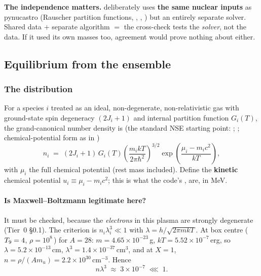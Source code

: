\textbf{The independence matters.}  deliberately uses \textbf{the
same nuclear inputs} as pynucastro (Rauscher partition functions,
, , ) but
an entirely separate solver. Shared data $+$ separate algorithm $=$ the
cross-check tests the \emph{solver}, not the data. If it used its own masses
too, agreement would prove nothing about either.

\subsection{Equilibrium from the ensemble}
\label{sec:ensemble}

\subsubsection{The distribution}
\label{sec:distribution}

For a species $i$ treated as an ideal, non-degenerate, non-relativistic gas with
ground-state spin degeneracy $(2J_i + 1)$ and internal partition function
$G_i(T)$, the grand-canonical number density is (the standard NSE starting
point: \citealp{clifford1965}; \citealp{hwe1985}; chemical-potential form as in
\citealp{seitenzahl2009})
%
\begin{equation}
n_i \;=\; (2J_i+1)\,G_i(T)\left(\frac{m_i kT}{2\pi\hbar^2}\right)^{3/2}
\exp\!\left(\frac{\mu_i - m_i c^2}{kT}\right),
\label{eq:ndensity}
\end{equation}
%
with $\mu_i$ the full chemical potential (rest mass included). Define the
\textbf{kinetic} chemical potential $u_i \equiv \mu_i - m_i c^2$; this is what
the code's ,  are, in MeV.

\paragraph{Is Maxwell--Boltzmann legitimate here?} It must be checked, because
the \emph{electrons} in this plasma are strongly degenerate (Tier~0 \S0.1). The
criterion is $n_i \lambda_i^3 \ll 1$ with $\lambda = h/\sqrt{2\pi m kT}$. At box
centre ($T_{9} = 4$, $\rho = 10^{8}$\,\gcc) for $A = 28$:
$m = 4.65\times10^{-23}$\,g, $kT = 5.52\times10^{-7}$\,erg, so
$\lambda = 5.2\times10^{-13}$\,cm, $\lambda^3 = 1.4\times10^{-37}$\,cm$^3$, and
at $X = 1$, $n = \rho/(A m_u) = 2.2\times10^{30}$\,cm$^{-3}$. Hence
%
\begin{equation}
n\lambda^3 \;\approx\; 3\times10^{-7} \;\lll\; 1.
\label{eq:nlambda3}
\end{equation}
\derivedhere

